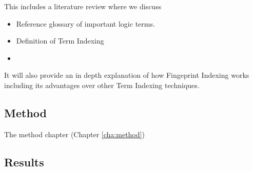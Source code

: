 This includes a literature review where we discuss 
\begin{itemize}
\item Reference glossary of important logic terms.
\item Definition of Term Indexing
\item
\end{itemize}

It will also provide
an in depth explanation of how Fingeprint Indexing works including its advantages
over other Term Indexing techniques.

\subsection{Method}

The method chapter (Chapter \ref{cha:method})

\subsection{Results}

